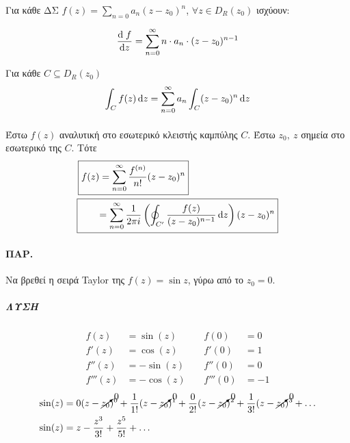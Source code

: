 \documentclass[12pt,a4paper,titlepage,fleqn]{article}
\begin{document}
  \begin{theorem*}{}
    Για κάθε ΔΣ \( f(z) = \sum_{n=0}  a_n(z-z_0)^n \), \(\forall z \in D_R(z_0) \)
    ισχύουν:
    \begin{enumgreekparen}
    	\item 
    	\[
    	\frac{\dif\; f}{\dif z} = 
    	\sum_{n=0}^\infty n\cdot a_n \cdot (z-z_0)^{n-1}
    	\]
    	
    	\item Για κάθε \( C \subseteq D_R(z_0) \)
    	\[
    	\int_C f(z) \dif z = \sum_{n=0}^\infty a_n \int_C (z-z_0)^n \dif z
    	\]
    \end{enumgreekparen}
  \end{theorem*}
  
  \paragraph{}
  \begin{theorem*}{}
  	Έστω \( f(z) \) αναλυτική στο εσωτερικό κλειστής καμπύλης \( C \).
  	Έστω \( z_0,\ z \) σημεία στο εσωτερικό της \( C \). Τότε
  	\begin{align*}
  	\Aboxed{f(z) &= \sum_{n=0}^\infty \frac{f^{(n)}}{n!} (z-z_0)^n}
  	\\ \Aboxed{
  		\qquad &= \sum_{n=0}^\infty \frac{1}{2\pi i} \left(
  		    \oint_{C'} \frac{f(z)}{(z-z_0)^{n-1}} \dif z
  		\right)(z-z_0)^n
  		}
  	\end{align*}
  \end{theorem*}
  
  \paragraph{ΠΑΡ.}
  Να βρεθεί η σειρά Taylor της \( f(z) = \sin z \), γύρω από το \( z_0 = 0 \).
  \subparagraph{ΛΥΣΗ}
  \[
  \begin{array}{rlrl}
  f(z) &= \sin(z)  \qquad & f(0)&=0                    \\
  f'(z) &= \cos(z) & f'(0) &= 1                     \\
  f''(z) &= -\sin(z) & f''(0) &= 0                  \\
  f'''(z) &= -\cos(z) & f'''(0) &= -1
  \end{array}
  \]
  \begin{align*}
  \sin(z) &= 0(z-\cancelto{0}{z_0})^0 + \frac{1}{1!}(z-\cancelto{0}{z_0})^1
  + \frac{0}{2!}(z-\cancelto{0}{z_0})^2 + \frac{1}{3!}(z-\cancelto{0}{z_0})^3+\dots
  \\ \sin(z) &= z - \frac{z^3}{3!} + \frac{z^5}{5!} + \dots
  \end{align*}
  
\end{document}
